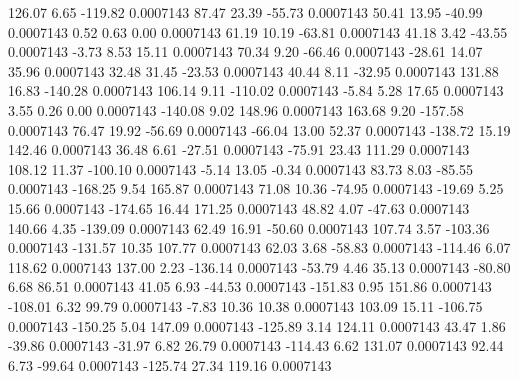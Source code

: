       126.07        6.65     -119.82     0.0007143
       87.47       23.39      -55.73     0.0007143
       50.41       13.95      -40.99     0.0007143
        0.52        0.63        0.00     0.0007143
       61.19       10.19      -63.81     0.0007143
       41.18        3.42      -43.55     0.0007143
       -3.73        8.53       15.11     0.0007143
       70.34        9.20      -66.46     0.0007143
      -28.61       14.07       35.96     0.0007143
       32.48       31.45      -23.53     0.0007143
       40.44        8.11      -32.95     0.0007143
      131.88       16.83     -140.28     0.0007143
      106.14        9.11     -110.02     0.0007143
       -5.84        5.28       17.65     0.0007143
        3.55        0.26        0.00     0.0007143
     -140.08        9.02      148.96     0.0007143
      163.68        9.20     -157.58     0.0007143
       76.47       19.92      -56.69     0.0007143
      -66.04       13.00       52.37     0.0007143
     -138.72       15.19      142.46     0.0007143
       36.48        6.61      -27.51     0.0007143
      -75.91       23.43      111.29     0.0007143
      108.12       11.37     -100.10     0.0007143
       -5.14       13.05       -0.34     0.0007143
       83.73        8.03      -85.55     0.0007143
     -168.25        9.54      165.87     0.0007143
       71.08       10.36      -74.95     0.0007143
      -19.69        5.25       15.66     0.0007143
     -174.65       16.44      171.25     0.0007143
       48.82        4.07      -47.63     0.0007143
      140.66        4.35     -139.09     0.0007143
       62.49       16.91      -50.60     0.0007143
      107.74        3.57     -103.36     0.0007143
     -131.57       10.35      107.77     0.0007143
       62.03        3.68      -58.83     0.0007143
     -114.46        6.07      118.62     0.0007143
      137.00        2.23     -136.14     0.0007143
      -53.79        4.46       35.13     0.0007143
      -80.80        6.68       86.51     0.0007143
       41.05        6.93      -44.53     0.0007143
     -151.83        0.95      151.86     0.0007143
     -108.01        6.32       99.79     0.0007143
       -7.83       10.36       10.38     0.0007143
      103.09       15.11     -106.75     0.0007143
     -150.25        5.04      147.09     0.0007143
     -125.89        3.14      124.11     0.0007143
       43.47        1.86      -39.86     0.0007143
      -31.97        6.82       26.79     0.0007143
     -114.43        6.62      131.07     0.0007143
       92.44        6.73      -99.64     0.0007143
     -125.74       27.34      119.16     0.0007143
